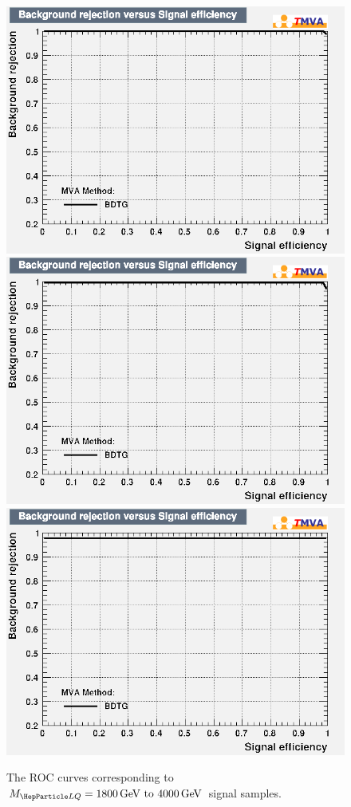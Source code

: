 \begin{figure}[H]
    {\includegraphics[width=.32\textwidth]{Images/Analysis/Results_LQToBMu_pair_uubj_BDTG_FullRun2_2023_01_25_020318/3000/rejBvsS.png}}
    {\includegraphics[width=.32\textwidth]{Images/Analysis/Results_LQToBMu_pair_uubj_BDTG_FullRun2_2023_01_25_020318/3500/rejBvsS.png}}
    {\includegraphics[width=.32\textwidth]{Images/Analysis/Results_LQToBMu_pair_uubj_BDTG_FullRun2_2023_01_25_020318/4000/rejBvsS.png}}
    \caption{The ROC curves corresponding to $\MLQ = \SIrange{1800}{4000}{GeV}$ signal samples.}
    \label{figapp:roc2}
\end{figure}

\clearpage